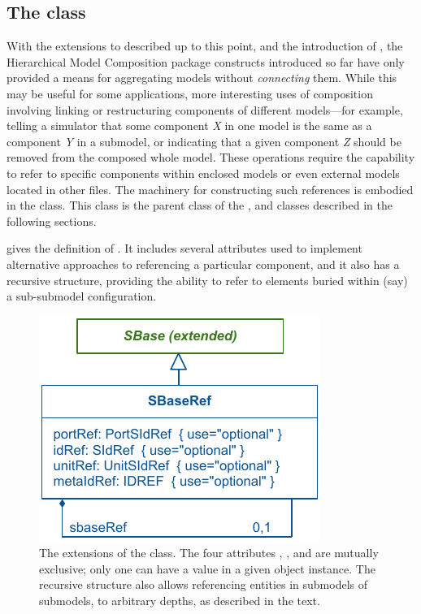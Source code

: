 \subsection{The  class}
\label{sbaseref-class}

With the extensions to \SBML described up to this point, and the
introduction of \ExternalModelDefinition, the Hierarchical Model
Composition package constructs introduced so far have only provided a
means for aggregating models without \emph{connecting} them.  While this
may be useful for some applications, more interesting uses of
composition involving linking or restructuring components of different
models---for example, telling a simulator that some component \emph{X}
in one model is the same as a component \emph{Y} in a submodel, or
indicating that a given component \emph{Z} should be removed from the
composed whole model.  These operations require the capability to refer
to specific components within enclosed models or even external models
located in other files.  The machinery for constructing such references
is embodied in the \SBaseRef class.  This class is the parent class of
the \Port, \Deletion and \ReplacedElement classes described in the
following sections.

 gives the definition of \SBaseRef.  It includes
several attributes used to implement alternative approaches to
referencing a particular component, and it also has a recursive
structure, providing the ability to refer to elements buried within
(say) a sub-submodel configuration.

\begin{figure}[hbt]
  \includegraphics{figs/sbaseref-uml}
  \caption{The extensions of the \SBaseRef class.  The four attributes
    , ,  and 
    are mutually exclusive; only one can have a value in a given object
    instance.  The recursive structure also allows referencing entities
    in submodels of submodels, to arbitrary depths, as described in the
    text.}
  \label{sbaseref-uml}
\end{figure}

